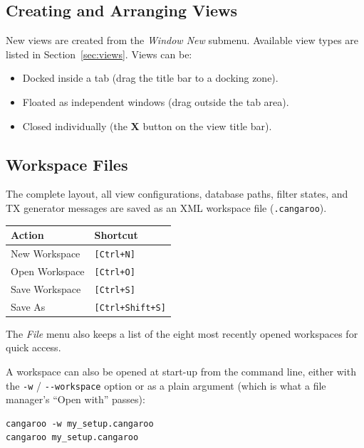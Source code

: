 \documentclass[a4paper,11pt]{article}
\newcommand{\key}[1]{\texttt{\small[#1]}}
\newcommand{\menu}[1]{\textit{#1}}
\newcommand{\ui}[1]{\textbf{#1}}
\newcommand{\file}[1]{\texttt{#1}}
\begin{document}
\subsection{Creating and Arranging Views}

New views are created from the \menu{Window \textrightarrow{} New} submenu.
Available view types are listed in Section~\ref{sec:views}.
Views can be:

\begin{itemize}
  \item Docked inside a tab (drag the title bar to a docking zone).
  \item Floated as independent windows (drag outside the tab area).
  \item Closed individually (the \ui{X} button on the view title bar).
\end{itemize}

\subsection{Workspace Files}

The complete layout, all view configurations, database paths, filter states, and
TX generator messages are saved as an XML workspace file (\file{.cangaroo}).

\begin{table}[h]
  \centering
  \begin{tabularx}{0.75\textwidth}{lX}
    \toprule
    \textbf{Action} & \textbf{Shortcut} \\
    \midrule
    New Workspace     & \key{Ctrl+N} \\
    Open Workspace    & \key{Ctrl+O} \\
    Save Workspace    & \key{Ctrl+S} \\
    Save As           & \key{Ctrl+Shift+S} \\
    \bottomrule
  \end{tabularx}
\end{table}

The \menu{File} menu also keeps a list of the eight most recently opened workspaces for
quick access.

A workspace can also be opened at start-up from the command line, either with the
\texttt{-w} / \texttt{-{}-workspace} option or as a plain argument (which is what a file
manager's ``Open with'' passes):

\begin{verbatim}
cangaroo -w my_setup.cangaroo
cangaroo my_setup.cangaroo
\end{verbatim}
\end{document}
